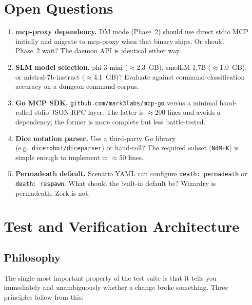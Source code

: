 \documentclass[a4paper,10pt]{article}
\newcommand{\pkg}[1]{\texttt{#1}}
\begin{document}
\section{Open Questions}

\begin{enumerate}[label=\textbf{Q\arabic*}.]
  \item \textbf{mcp-proxy dependency.}
    DM mode (Phase~2) should use direct stdio MCP initially and
    migrate to mcp-proxy when that binary ships.  Or should Phase~2
    wait?  The daemon API is identical either way.
  \item \textbf{SLM model selection.}
    phi-3-mini ($\approx$2.3~GB), smolLM-1.7B ($\approx$1.0~GB),
    or mistral-7b-instruct ($\approx$4.1~GB)?  Evaluate against
    command-classification accuracy on a dungeon command corpus.
  \item \textbf{Go MCP SDK.}
    \pkg{github.com/mark3labs/mcp-go} versus a minimal hand-rolled
    stdio JSON-RPC layer.  The latter is $\approx$200 lines and avoids
    a dependency; the former is more complete but less battle-tested.
  \item \textbf{Dice notation parser.}
    Use a third-party Go library (e.g.\ \pkg{dicerobot/diceparser})
    or hand-roll?  The required subset (\texttt{NdM+K}) is simple
    enough to implement in $\approx$50 lines.
  \item \textbf{Permadeath default.}
    Scenario YAML can configure \texttt{death: permadeath} or
    \texttt{death: respawn}.  What should the built-in default be?
    Wizardry is permadeath; Zork is not.
\end{enumerate}

\section{Test and Verification Architecture}
\label{sec:testing}

\subsection{Philosophy}

The single most important property of the test suite is that it tells
you immediately and unambiguously whether a change broke something.
Three principles follow from this:
\end{document}
